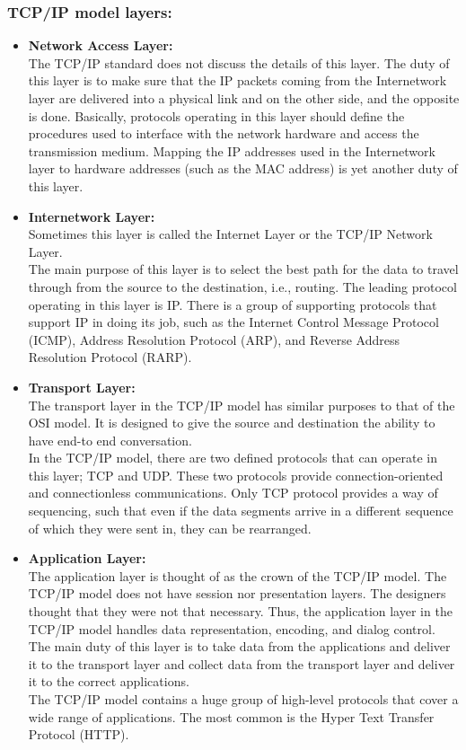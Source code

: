 				\subsubsection{TCP/IP model layers:}
					\begin{itemize}
						\let\labelitemi\labelitemii
						\item \textbf{Network Access Layer:}\\
						The TCP/IP standard does not discuss the details of this layer. The duty of this layer is to make sure that the IP packets coming from the Internetwork layer are delivered into a physical link and on the other side, and the opposite is done. Basically, protocols operating in this layer should define the procedures used to interface with the network hardware and access the transmission medium. Mapping the IP addresses used in the Internetwork layer to hardware addresses (such as the MAC address) is yet another duty of this layer.
						\item \textbf{Internetwork Layer:}\\
						Sometimes this layer is called the Internet Layer or the TCP/IP Network Layer. \\
						The main purpose of this layer is to select the best path for the data to travel through from the source to the destination, i.e., routing. The leading protocol operating in this layer is IP. There is a group of supporting protocols that support IP in doing its job, such as the Internet Control Message Protocol (ICMP), Address Resolution Protocol (ARP), and Reverse Address Resolution Protocol (RARP).
						\item \textbf{Transport Layer:}\\
						The transport layer in the TCP/IP model has similar purposes to that of the OSI model. It is designed to give the source and destination the ability to have end-to end conversation. \\
						In the TCP/IP model, there are two defined protocols that can operate in this layer; TCP and UDP. These two protocols provide connection-oriented and connectionless communications. Only TCP protocol provides a way of sequencing, such that even if the data segments arrive in a different sequence of which they were sent in, they can be rearranged.
						\item \textbf{Application Layer:}\\
						The application layer is thought of as the crown of the TCP/IP model. The TCP/IP model does not have session nor presentation layers. The designers thought that they were not that necessary. Thus, the application layer in the TCP/IP model handles data representation, encoding, and dialog control. The main duty of this layer is to take data from the applications and deliver it to the transport layer and collect data from the transport layer and deliver it to the correct applications. \\
						The TCP/IP model contains a huge group of high-level protocols that cover a wide range of applications. The most common is the Hyper Text Transfer Protocol (HTTP).
					\end{itemize}
				
